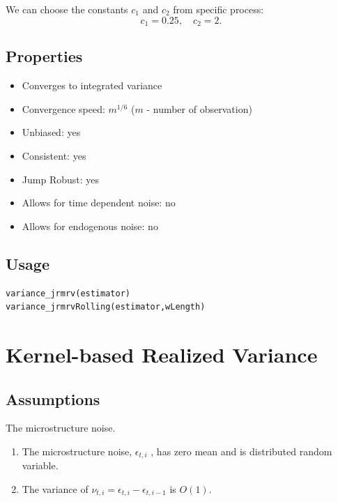 \documentclass[letterpaper]{report}
\begin{document}
We can choose the constants $c_1$ and $c_2$ from specific process:
\begin{equation}
c_1 = 0.25, \quad
c_2 = 2.
\end{equation}
\subsection{Properties}
\begin{itemize}
\item Converges to integrated variance
\item Convergence speed: $m^{1/6}$ ($m$ - number of observation)
\item Unbiased: yes
\item Consistent: yes
\item Jump Robust: yes
\item Allows for time dependent noise: no
\item Allows for endogenous noise: no
\end{itemize}
  \subsection{Usage}
\begin{lstlisting}
variance_jrmrv(estimator)
variance_jrmrvRolling(estimator,wLength)
\end{lstlisting}

\section{Kernel-based Realized Variance}
\subsection{Assumptions}
The microstructure noise.
\begin{enumerate}
\item The microstructure noise, $\epsilon_{t,i}$ , has zero mean and is distributed random variable.
\item The variance of $\nu_{t,i} = \epsilon_{t,i} - \epsilon_{t,i-1}$ is
$O(1)$.
\end{enumerate}
\end{document}
